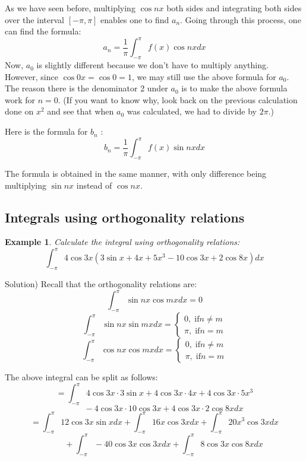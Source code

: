 \documentclass[12pt]{report}
\newtheorem{ex}{Example}[section]
\begin{document}
As we have seen before, multiplying $\cos nx$ both sides and integrating both sides over the interval $[-\pi, \pi]$ enables one to find $a_n$. Going through this process, one can find the formula:
$$a_n = \frac{1}{\pi} \int_{-\pi}^{\pi} f(x) \cos nx dx$$
Now, $a_0$ is slightly different because we don't have to multiply anything. However, since $\cos 0x = \cos 0 = 1$, we may still use the above formula for $a_0$. The reason there is the denominator 2 under $a_0$ is to make the above formula work for $n=0$. (If you want to know why, look back on the previous calculation done on $x^2$ and see that when $a_0$ was calculated, we had to divide by $2\pi$.)

Here is the formula for $b_n$ :
$$b_n = \frac{1}{\pi} \int_{-\pi}^{\pi} f(x) \sin nx dx$$

The formula is obtained in the same manner, with only difference being multiplying $\sin nx$ instead of $\cos nx$.

\subsection*{Integrals using orthogonality relations}

\begin{ex} Calculate the integral using orthogonality relations:
$$ \int_{-\pi}^{\pi} 4 \cos 3x \left( 3 \sin x + 4x + 5x^3 -10 \cos 3x + 2 \cos 8x \right) dx $$
\end{ex}

Solution) Recall that the orthogonality relations are:
$$\int_{-\pi}^{\pi} \sin nx \cos mx dx = 0$$
$$\int_{-\pi}^{\pi} \sin nx \sin mx dx = \begin{cases} 0, \; \mathrm{ if } n \neq m \\ \pi, \; \mathrm{ if } n = m \end{cases} $$
$$\int_{-\pi}^{\pi} \cos nx \cos mx dx = \begin{cases} 0, \; \mathrm{ if } n \neq m \\ \pi, \; \mathrm{ if } n = m \end{cases} $$

The above integral can be split as follows:
$$ =\int_{-\pi}^{\pi} 4 \cos 3x \cdot 3 \sin x + 4 \cos 3x \cdot 4x + 4 \cos 3x \cdot 5x^3$$
$$ \; \; \; \; \; \; \; \; -4 \cos 3x \cdot 10 \cos 3x + 4 \cos 3x \cdot 2 \cos 8x  dx $$
$$ = \int_{-\pi}^{\pi} 12 \cos 3x \sin x dx +\int_{-\pi}^{\pi} 16 x \cos 3x dx +\int_{-\pi}^{\pi} 20 x^3 \cos 3x dx $$
$$ \; \; \; \; \; \; \; \; +\int_{-\pi}^{\pi} -40 \cos 3x \cos 3x  dx +\int_{-\pi}^{\pi} 8 \cos 3x \cos 8x dx $$
\end{document}
